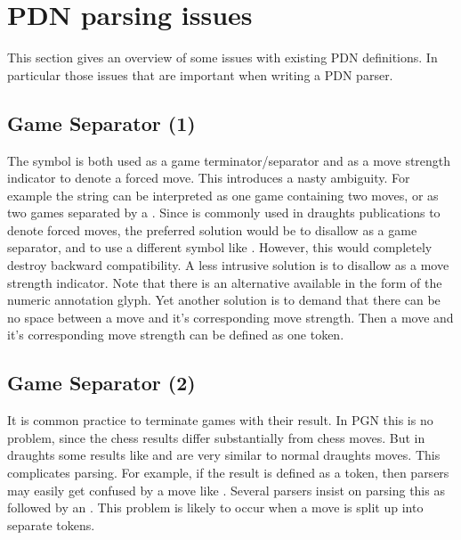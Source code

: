 \documentclass[letterpaper,10pt,english]{sphinxmanual}
\begin{document}
\chapter{PDN parsing issues}
\label{\detokenize{issues:pdn-parsing-issues}}\label{\detokenize{issues:issues-section}}\label{\detokenize{issues::doc}}
\sphinxAtStartPar
This section gives an overview of some issues with existing PDN definitions. In particular
those issues that are important when writing a PDN parser.


\section{Game Separator (1)}
\label{\detokenize{issues:game-separator-1}}
\sphinxAtStartPar
The \sphinxcode{\sphinxupquote{*}} symbol is both used as a game terminator/separator and as a move strength
indicator to denote a forced move. This introduces a nasty ambiguity.
For example the string  can be interpreted as one game containing two moves,
or as two games separated by a \sphinxcode{\sphinxupquote{*}}. Since \sphinxcode{\sphinxupquote{*}} is commonly used in draughts publications
to denote forced moves, the preferred solution would be to disallow \sphinxcode{\sphinxupquote{*}} as a game separator,
and to use a different symbol like \sphinxcode{\sphinxupquote{\#}}. However, this would completely destroy backward
compatibility. A less intrusive solution is to disallow \sphinxcode{\sphinxupquote{*}} as a move strength indicator.
Note that there is an alternative available in the form of the  numeric annotation
glyph. Yet another solution is to demand that there can be no space between a move and it’s
corresponding move strength. Then a move and it’s corresponding move strength can be
defined as one token.


\section{Game Separator (2)}
\label{\detokenize{issues:game-separator-2}}
\sphinxAtStartPar
It is common practice to terminate games with their result. In PGN this is no problem,
since the chess results differ substantially from chess moves. But in draughts some
results like  and  are very similar to normal draughts moves. This complicates
parsing. For example, if the result  is defined as a token, then parsers may easily
get confused by a move like . Several parsers insist on parsing this as
 followed by an . This problem is likely to occur when a move is split up into
separate tokens.
\end{document}
